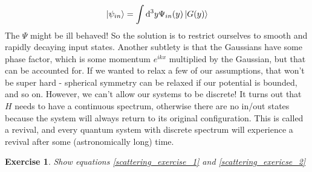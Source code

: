 \documentclass{article}
\newtheorem{exercise}{Exercise}[section]
\begin{document}
\[\ket{\psi_{in}} = \int \dd^3 y \Psi_{in}(y)\ket{G(y)}\]
The $\Psi$ might be ill behaved! So the solution is to restrict ourselves to smooth and rapidly decaying input states. Another subtlety is that the Gaussians have some phase factor, which is some momentum $e^{ikx}$ multiplied by the Gaussian, but that can be accounted for. If we wanted to relax a few of our assumptions, that won't be super hard - spherical symmetry can be relaxed if our potential is bounded, and so on. However, we can't allow our systems to be discrete! It turns out that $H$ needs to have a continuous spectrum, otherwise there are no in/out states because the system will always return to its original configuration. This is called a revival, and every quantum system with discrete spectrum will experience a revival after some (astronomically long) time.
\begin{exercise} Show equations \eqref{scattering_exercise_1} and \eqref{scattering_exericse_2}\end{exercise}
\end{document}
